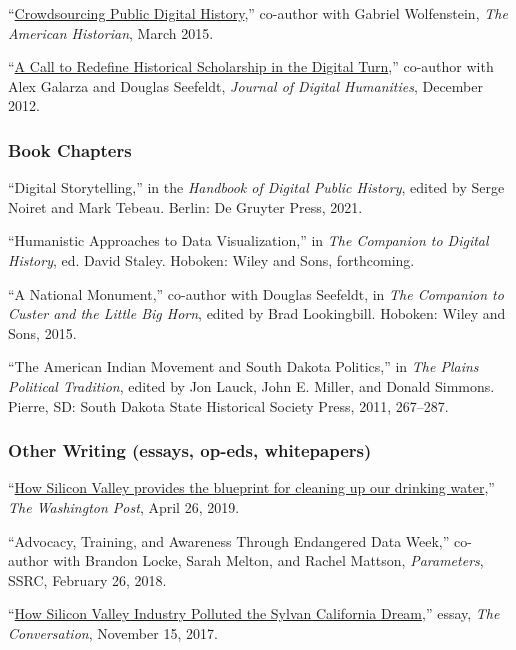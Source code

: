 ``\href{http://tah.oah.org/content/crowdsourcing-digital-public-history/}{Crowdsourcing
Public Digital History},'' co-author with Gabriel Wolfenstein, \emph{The
American Historian}, March 2015.

``\href{http://journalofdigitalhumanities.org/1-4/a-call-to-redefine-historical-scholarship-in-the-digital-turn/}{A
Call to Redefine Historical Scholarship in the Digital Turn},''
co-author with Alex Galarza and Douglas Seefeldt, \emph{Journal of
Digital Humanities}, December 2012.

\subsubsection{Book Chapters}\label{book-chapters}

``Digital Storytelling,'' in the \emph{Handbook of Digital Public
History}, edited by Serge Noiret and Mark Tebeau. Berlin: De Gruyter
Press, 2021.

``Humanistic Approaches to Data Visualization,'' in \emph{The Companion
to Digital History}, ed. David Staley. Hoboken: Wiley and Sons,
forthcoming.

``A National Monument,'' co-author with Douglas Seefeldt, in \emph{The
Companion to Custer and the Little Big Horn}, edited by Brad
Lookingbill. Hoboken: Wiley and Sons, 2015.

``The American Indian Movement and South Dakota Politics,'' in \emph{The
Plains Political Tradition}, edited by Jon Lauck, John E. Miller, and
Donald Simmons. Pierre, SD: South Dakota State Historical Society Press,
2011, 267--287.

\subsubsection{Other Writing (essays, op-eds,
whitepapers)}\label{other-writing-essays-op-eds-whitepapers}

``\href{https://www.washingtonpost.com/outlook/2019/04/26/how-silicon-valley-provides-blueprint-cleaning-up-our-drinking-water/}{How
Silicon Valley provides the blueprint for cleaning up our drinking
water},'' \emph{The Washington Post}, April 26, 2019.

``Advocacy, Training, and Awareness Through Endangered Data Week,''
co-author with Brandon Locke, Sarah Melton, and Rachel Mattson,
\emph{Parameters}, SSRC, February 26, 2018.

``\href{https://theconversation.com/how-silicon-valley-industry-polluted-the-sylvan-california-dream-85810}{How
Silicon Valley Industry Polluted the Sylvan California Dream},'' essay,
\emph{The Conversation}, November 15, 2017.

